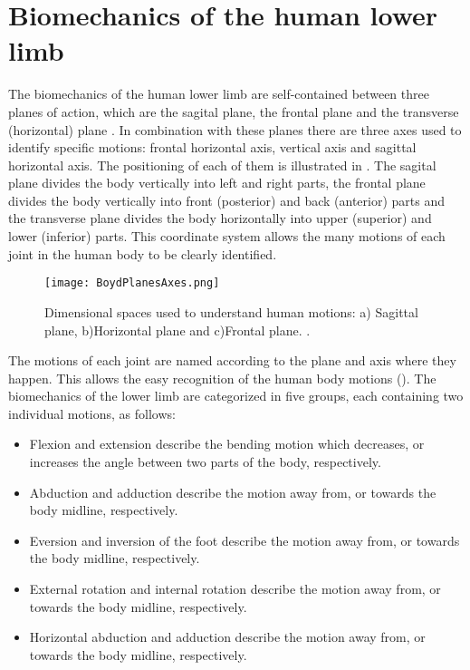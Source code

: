 \section{Biomechanics of the human lower limb}

The biomechanics of the human lower limb are self-contained between three planes of action, which are the sagital plane, the frontal plane and the transverse (horizontal) plane \cite{PhysicalSolutions2016}. In combination with these planes there are three axes used to identify specific motions: frontal horizontal axis, vertical axis and sagittal horizontal axis. The positioning of each of them is illustrated in . The sagital plane divides the body vertically into left and right parts, the frontal plane divides the body vertically into front (posterior) and back (anterior) parts and the transverse plane divides the body horizontally into upper (superior) and lower (inferior) parts. This coordinate system allows the many motions of each joint in the human body to be clearly identified.

\begin{figure}[htbp!]
	\centering
	\texttt{[image: BoydPlanesAxes.png]}
	\caption{Dimensional spaces used to understand human motions: a) Sagittal plane, b)Horizontal plane and c)Frontal plane. \cite{PhysicalSolutions2016}. }
	\label{fig:body_planes_axes}
\end{figure}

\newpage
The motions of each joint are named according to the plane and axis where they happen. This allows the easy recognition of the human body motions (). The biomechanics of the lower limb are categorized in five groups, each containing two individual motions, as follows:
\begin{itemize}
	\item Flexion and extension describe the bending motion which decreases, or increases the angle between two parts of the body, respectively.
	\item Abduction and adduction describe the motion away from, or towards the body midline, respectively.
	\item Eversion and inversion of the foot describe the motion away from, or towards the body midline, respectively.
	\item External rotation and internal rotation describe the motion away from, or towards the body midline, respectively.
	\item Horizontal abduction and adduction describe the motion away from, or towards the body midline, respectively.
\end{itemize}

